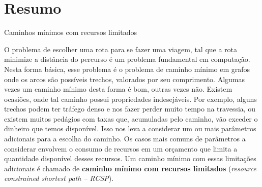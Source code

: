 \documentclass[12pt,twoside,a4paper]{book}
\begin{document}
      






\chapter*{Resumo}

\begin{center}
  \Large{Caminhos mínimos com recursos limitados}
\end{center}

O problema de escolher uma rota para se fazer uma viagem, tal que a rota 
minimize a distância do percurso é um problema fundamental em 
computação. Nesta forma básica, esse problema é o problema de caminho 
mínimo em grafos onde os arcos são possíveis trechos, valorados por seu 
comprimento. Algumas vezes um caminho mínimo desta forma é bom, outras 
vezes não. Existem ocasiões, onde tal caminho possui propriedades 
indesejáveis. Por exemplo, alguns trechos podem ter tráfego denso e nos 
fazer perder muito tempo na travessia, ou existem muitos pedágios com 
taxas que, acumuladas pelo caminho, vão exceder o dinheiro que temos 
disponível.  Isso nos leva a considerar um ou mais parâmetros adicionais 
para a escolha do caminho.  Os casos mais comuns de parâmetros a 
considerar envolvem o consumo de recursos em um orçamento que limita a 
quantidade disponível desses recursos. Um caminho mínimo com essas 
limitações adicionais é chamado de {\bf caminho mínimo com recursos 
limitados } ({\it resource constrained shortest path -- \textsc{RCSP}}). 
\end{document}
